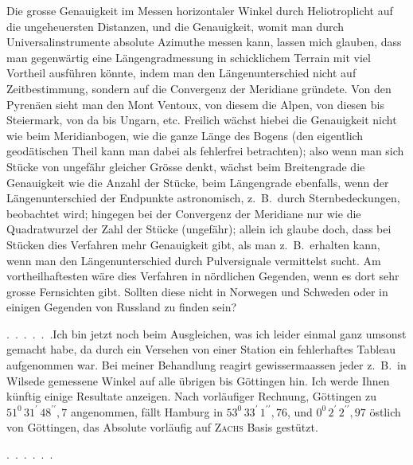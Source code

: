 \par\noindent\hspace*{\parindent}Die grosse Genauigkeit im Messen horizontaler Winkel durch Heliotroplicht auf die ungeheuersten Distanzen, und die Genauigkeit, womit man durch Universalinstrumente absolute Azimuthe messen kann, lassen mich glauben, dass man gegenwärtig eine Längengradmessung in schicklichem Terrain mit viel Vortheil ausführen könnte, indem man den Längenunterschied nicht auf Zeitbestimmung, sondern auf die Convergenz der Meridiane gründete.
Von den Pyrenäen sieht man den Mont Ventoux, von diesem die Alpen, von diesen bis Steiermark, von da bis Ungarn, etc.
Freilich wächst hiebei die Genauigkeit nicht wie beim Meridianbogen, wie die ganze Länge des Bogens (den eigentlich geodätischen Theil kann man dabei als fehlerfrei betrachten); also wenn man sich Stücke von ungefähr gleicher Grösse denkt, wächst beim Breitengrade die Genauigkeit wie die Anzahl der Stücke, beim Längengrade ebenfalls, wenn der Längenunterschied der Endpunkte astronomisch, z.~B.\ durch Sternbedeckungen, beobachtet wird; hingegen bei der Convergenz der Meridiane nur wie die Quadratwurzel der Zahl der Stücke (ungefähr); allein ich glaube doch, dass bei  Stücken dies Verfahren mehr Genauigkeit gibt, als man z.~B.\ erhalten kann, wenn man den Längenunterschied durch Pulversignale vermittelst  sucht.
Am vortheilhaftesten wäre dies Verfahren in nördlichen Gegenden, wenn es dort sehr grosse Fernsichten gibt.
Sollten diese nicht in Norwegen und Schweden oder in einigen Gegenden von Russland zu finden sein?

\par\noindent\hspace*{\parindent}.\ .\ .\ .\ .\ .\quad Ich bin jetzt noch beim Ausgleichen, was ich leider einmal ganz umsonst gemacht habe, da durch ein Versehen von einer Station ein fehlerhaftes Tableau aufgenommen war.
Bei meiner Behandlung reagirt gewissermaassen jeder z.~B.\ in Wilsede gemessene Winkel auf alle übrigen bis Göttingen hin.
Ich werde Ihnen künftig einige Resultate anzeigen.
Nach vorläufiger Rechnung, Göttingen zu \(51^{0}\,31^{\prime}\,48^{\prime\prime}{,}7\) angenommen, fällt Hamburg in \(53^{0}\,33^{\prime}\,1^{\prime\prime}{,}76\), und \(0^{0}\,2^{\prime}\,2^{\prime\prime}{,}97\) östlich von Göttingen, das Absolute vorläufig auf \textsc{Zachs} Basis gestützt.
\par\noindent\hspace*{\parindent}.\ .\ .\ .\ .\ .
\endgroup
